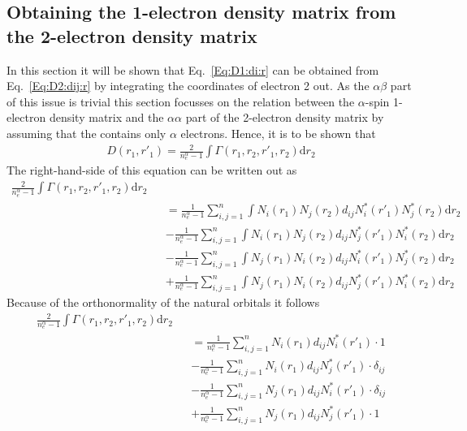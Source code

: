 \documentclass[pra,nofootinbib]{revtex4-1}
\newcommand{\nela}{{n_{e}^\alpha}}
\newcommand{\dlabel}[1]{\text{#1}\label{#1}}
\begin{document}
\subsection{Obtaining the 1-electron density matrix from the 2-electron density matrix}
\dlabel{Sect:Integrate}

In this section it will be shown that
Eq.~\ref{Eq:D1:di:r} can be obtained from Eq.~\ref{Eq:D2:dij:r} by integrating the coordinates
of electron 2 out. As the $\alpha\beta$ part of this issue is trivial this section focusses
on the relation between the $\alpha$-spin 1-electron density matrix and the $\alpha\alpha$ part of
the 2-electron density matrix by assuming that the contains only $\alpha$ electrons. 
Hence, it is to be shown that
\begin{eqnarray}
   D(r_1,r'_1) = \frac{2}{\nela-1}\int\Gamma(r_1,r_2,r'_1,r_2)\mathrm{d}r_2
\end{eqnarray}
The right-hand-side of this equation can be written out as
\begin{eqnarray}
  \frac{2}{\nela-1}\int\Gamma(r_1,r_2,r'_1,r_2)\mathrm{d}r_2 \nonumber \\
  &&= \frac{1}{\nela-1}\sum_{i,j=1}^{n}\int N_i(r_1)N_j(r_2) d_{ij} N_i^*(r'_1)N_j^*(r_2)\mathrm{d}r_2 \nonumber \\
  &&- \frac{1}{\nela-1}\sum_{i,j=1}^{n}\int N_i(r_1)N_j(r_2) d_{ij} N_j^*(r'_1)N_i^*(r_2)\mathrm{d}r_2 \nonumber \\
  &&- \frac{1}{\nela-1}\sum_{i,j=1}^{n}\int N_j(r_1)N_i(r_2) d_{ij} N_i^*(r'_1)N_j^*(r_2)\mathrm{d}r_2 \nonumber \\
  &&+ \frac{1}{\nela-1}\sum_{i,j=1}^{n}\int N_j(r_1)N_i(r_2) d_{ij} N_j^*(r'_1)N_i^*(r_2)\mathrm{d}r_2 
\end{eqnarray}
Because of the orthonormality of the natural orbitals it follows
\begin{eqnarray}
  \frac{2}{\nela-1}\int\Gamma(r_1,r_2,r'_1,r_2)\mathrm{d}r_2 \nonumber \\
  &&= \frac{1}{\nela-1}\sum_{i,j=1}^{n}     N_i(r_1)         d_{ij} N_i^*(r'_1) \cdot 1                \nonumber \\
  &&- \frac{1}{\nela-1}\sum_{i,j=1}^{n}     N_i(r_1)         d_{ij} N_j^*(r'_1) \cdot \delta_{ij}      \nonumber \\
  &&- \frac{1}{\nela-1}\sum_{i,j=1}^{n}     N_j(r_1)         d_{ij} N_i^*(r'_1) \cdot \delta_{ij}      \nonumber \\
  &&+ \frac{1}{\nela-1}\sum_{i,j=1}^{n}     N_j(r_1)         d_{ij} N_j^*(r'_1) \cdot 1                
\end{eqnarray}
\end{document}
